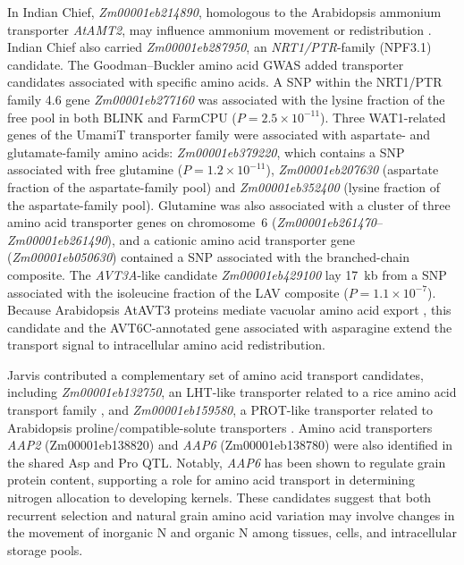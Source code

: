 In Indian Chief, \textit{Zm00001eb214890}, homologous to the Arabidopsis ammonium transporter \textit{AtAMT2}, may influence ammonium movement or redistribution \citep{Neuhaeuser2009AtAMT2}. Indian Chief also carried \textit{Zm00001eb287950}, an \textit{NRT1/PTR}-family (NPF3.1) candidate. The Goodman--Buckler amino acid GWAS added transporter candidates associated with specific amino acids. A SNP within the NRT1/PTR family 4.6 gene \textit{Zm00001eb277160} was associated with the lysine fraction of the free pool in both BLINK and FarmCPU ($P = 2.5 \times 10^{-11}$). Three WAT1-related genes of the UmamiT transporter family were associated with aspartate- and glutamate-family amino acids: \textit{Zm00001eb379220}, which contains a SNP associated with free glutamine ($P = 1.2 \times 10^{-11}$), \textit{Zm00001eb207630} (aspartate fraction of the aspartate-family pool) and \textit{Zm00001eb352400} (lysine fraction of the aspartate-family pool). Glutamine was also associated with a cluster of three amino acid transporter genes on chromosome~6 (\textit{Zm00001eb261470}--\textit{Zm00001eb261490}), and a cationic amino acid transporter gene (\textit{Zm00001eb050630}) contained a SNP associated with the branched-chain composite. The \textit{AVT3A}-like candidate \textit{Zm00001eb429100} lay 17~kb from a SNP associated with the isoleucine fraction of the LAV composite ($P = 1.1 \times 10^{-7}$). Because Arabidopsis AtAVT3 proteins mediate vacuolar amino acid export \citep{Fujiki2017AtAVT3}, this candidate and the AVT6C-annotated gene associated with asparagine extend the transport signal to intracellular amino acid redistribution.

Jarvis contributed a complementary set of amino acid transport candidates, including \textit{Zm00001eb132750}, an LHT-like transporter related to a rice amino acid transport family \citep{Fan2023LHT}, and \textit{Zm00001eb159580}, a PROT-like transporter related to Arabidopsis proline/compatible-solute transporters \citep{Lehmann2011ProT}. Amino acid transporters \textit{AAP2} (Zm00001eb138820) and \textit{AAP6} (Zm00001eb138780) were also identified in the shared Asp and Pro QTL. Notably, \textit{AAP6} has been shown to regulate grain protein content\citep{Wang2022}, supporting a role for amino acid transport in determining nitrogen allocation to developing kernels. These candidates suggest that both recurrent selection and natural grain amino acid variation may involve changes in the movement of inorganic N and organic N among tissues, cells, and intracellular storage pools.

